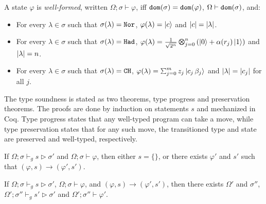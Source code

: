 \begin{definition}\label{def:well-formed}\rm 
  A state $\varphi$ is \emph{well-formed}, written
  $\Omega;\sigma \vdash \varphi$, iff $\mathtt{dom}(\sigma) = \mathtt{dom}(\varphi)$, $\Omega\vdash\mathtt{dom}(\sigma)$, and:
\begin{itemize}
\item For every $\lambda \in \sigma$ such that $\sigma(\lambda) = \texttt{Nor}$, $\varphi(\lambda)=\left\vert{c}\right\rangle$ and $|c|=|\lambda|$.

\item For every $\lambda \in \sigma$ such that $\sigma(\lambda) = \texttt{Had}$, $\varphi(\lambda)=\shad{2^n}{n}{\alpha(r_j)}$ and $|\lambda|=n$.

\item For every $\lambda \in \sigma$ such that $\sigma(\lambda) = \texttt{CH}$, $\varphi(\lambda)=\sch{m}{z_j}{c_j\,\beta_j}$ and $|\lambda|=|c_j|$ for all $j$.
\end{itemize}
\end{definition}

The \qafny type soundness is stated as two theorems, type progress and preservation theorems. The proofs are done by induction on \qafny statements $s$ and mechanized in Coq. Type progress states that any well-typed \qafny program can take a move, while type preservation states that for any such move, the transitioned type and state are preserved and well-typed, respectively.

\begin{theorem}\label{thm:type-progress-oqasm}\rm 
If $\Omega;\sigma \vdash_g s \triangleright \sigma'$ and $\Omega;\sigma \vdash \varphi$, then either $s=\{\}$, or there exists $\varphi'$ and $s'$ such that $(\varphi,s)\longrightarrow (\varphi',s')$.
\end{theorem}

\begin{theorem}\label{thm:type-preservation-oqasm}\rm 
If $\Omega;\sigma \vdash_g s \triangleright \sigma'$, $\Omega;\sigma \vdash \varphi$, and $(\varphi,s)\longrightarrow (\varphi',s')$, then 
there exists $\Omega'$ and $\sigma''$, $\Omega';\sigma'' \vdash_g s' \triangleright \sigma'$ and $\Omega';\sigma'' \vdash \varphi'$.
\end{theorem}


